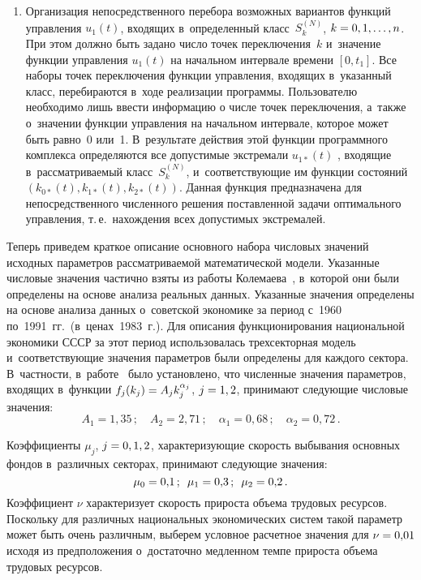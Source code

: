\begin{multicols}{2}
\begin{enumerate}[1.]
\item Организация непосредственного перебора возможных вариантов функций 
управления $u_1(t)$, входящих в~определенный класс~$S^{(N)}_k$, 
$k\hm=0,1,\ldots,n$. При этом должно быть задано число точек переключения~$k$ 
и~значение функции управления $u_1(t)$ на начальном интервале времени $[0,t_1]$. 
Все наборы точек переключения функции управления, входящих в~указанный класс, 
перебираются в~ходе реализации программы. Пользователю необходимо лишь ввести 
информацию о числе точек переключения, а~так\-же о~значении функции управления 
на начальном интервале, которое может быть равно~0 или~1. 
В~результате действия этой функции программного комплекса определяются все 
допустимые экстремали $u_{1*}(t)$ , входящие в~рассматриваемый класс~$S^{(N)}_k$, 
и~соответствующие им функции состояний  $(k_{0*}(t),k_{1*}(t),k_{2*}(t))$. 
Данная функция предназначена для непосредственного численного решения поставленной 
задачи оптимального управления, т.\,е.\ нахождения всех допустимых экстремалей.
\end{enumerate}

Теперь приведем краткое описание основного набора числовых значений исходных параметров 
рассматриваемой математической модели. Указанные числовые значения частично взяты 
из работы Колемаева~\cite{12-gor}, в~которой они были определены на основе 
анализа реальных данных. Указанные значения определены на основе анализа данных 
о~советской экономике за период с~1960 по~1991~гг.\ (в~це\-нах~1983~г.). 
Для описания функционирования национальной экономики СССР за этот период использовалась 
трехсекторная модель и~соответствующие значения параметров были определены для каждого 
сектора. В~част\-ности, в~работе~\cite{12-gor} было установлено, что численные значения 
параметров, входящих в~функции $f_j(k_j)\hm=A_j k^{\alpha_j}_j$, $j\hm=1,2$, принимают 
следующие числовые значения:
\begin{equation*} 
 A_1=1{,}35\,; \quad A_2=2{,}71\,; \quad \alpha_1=0{,}68\,; \quad  \alpha_2=0{,}72\,.
\end{equation*}

Коэффициенты $\mu_j$, $j\hm=0,1,2$, характеризующие скорость выбывания основных фондов 
в~различных секторах, принимают следующие значения:
$$
\mu_0=0{,}1\,; \enskip  \mu_1=0{,}3\,; \enskip \mu_2=0{,}2\,.
$$
Коэффициент $\nu$ характеризует скорость прироста объема 
трудовых ресурсов. Поскольку для различных национальных экономических систем такой 
параметр может быть очень различным, выберем условное расчетное значения для $\nu\hm=0{,}01$ 
исходя из предположения о~достаточно медленном темпе прироста объема трудовых ресурсов.


\end{multicols}
